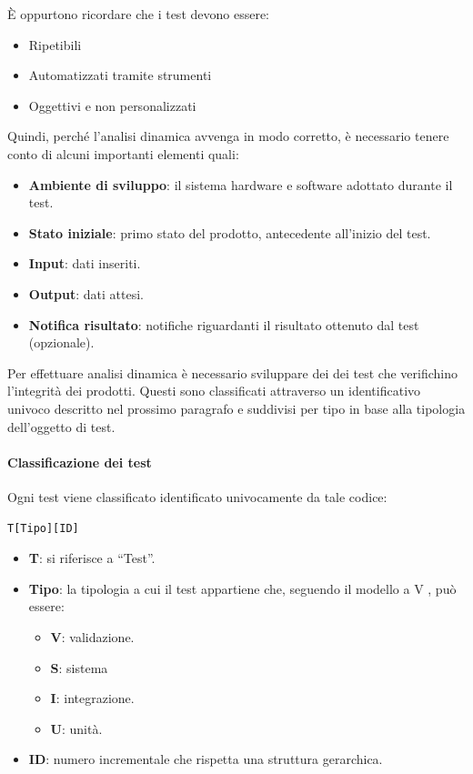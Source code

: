	    È oppurtono ricordare che i test devono essere:
	    \begin{itemize}
	    	\item Ripetibili
	    	\item Automatizzati tramite strumenti
	    	\item Oggettivi e non personalizzati
	    \end{itemize}
	    
	    Quindi, perché l'analisi dinamica avvenga in modo corretto, è necessario tenere conto di alcuni importanti elementi quali:
	    \begin{itemize}
	    	\item \textbf{Ambiente di sviluppo}: il sistema hardware e software adottato durante il test.
	    	\item \textbf{Stato iniziale}: primo stato del prodotto, antecedente all'inizio del test.
	    	\item \textbf{Input}: dati inseriti.
	    	\item \textbf{Output}: dati attesi.
	    	\item \textbf{Notifica risultato}: notifiche riguardanti il risultato ottenuto dal test (opzionale).
	    \end{itemize}
	    
	    Per effettuare analisi dinamica è necessario sviluppare dei dei test che verifichino l'integrità dei prodotti. Questi sono classificati attraverso un identificativo univoco descritto nel prossimo paragrafo e suddivisi per tipo in base alla tipologia dell'oggetto di test.
	    
	    \paragraph{Classificazione dei test}\label{ClassificazioneTest}
	    Ogni test viene classificato identificato univocamente da tale codice:
	    
	    \begin{center}
	    	\texttt{T[Tipo][ID]}
	    \end{center}
	    
	    \begin{itemize}
	    	\item \textbf{T}: si riferisce a ``Test''.
	    	\item \textbf{Tipo}: la tipologia a cui il test appartiene che, seguendo il modello a V%
	    	, può essere:
	    	\begin{itemize}
	    		\item \textbf{V}: validazione.
	    		\item \textbf{S}: sistema
	    		\item \textbf{I}: integrazione.
	    		\item \textbf{U}: unità.
	    	\end{itemize}
	    	\item \textbf{ID}: numero incrementale che rispetta una struttura gerarchica.
	    \end{itemize}
	    

